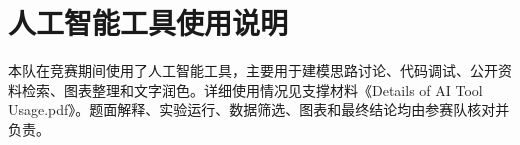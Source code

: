 \section*{人工智能工具使用说明}
本队在竞赛期间使用了人工智能工具，主要用于建模思路讨论、代码调试、公开资料检索、图表整理和文字润色。详细使用情况见支撑材料《Details of AI Tool Usage.pdf》。题面解释、实验运行、数据筛选、图表和最终结论均由参赛队核对并负责。
